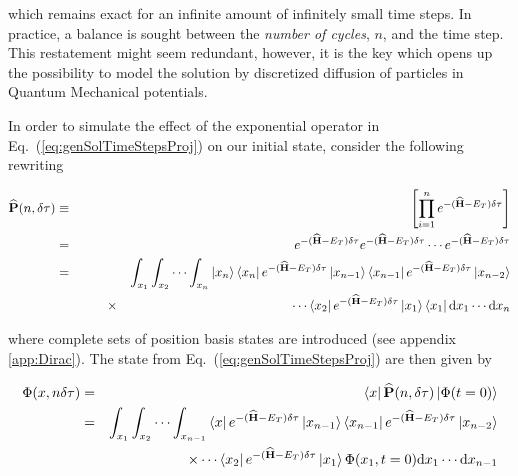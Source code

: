 

which remains exact for an infinite amount of infinitely small time steps. In practice, a balance is sought between the \textit{number of cycles}, $n$, and the time step. This restatement might seem redundant, however, it is the key which opens up the possibility to model the solution by discretized diffusion of particles in Quantum Mechanical potentials. 

In order to simulate the effect of the exponential operator in Eq.~(\ref{eq:genSolTimeStepsProj}) on our initial state,
consider the following rewriting

\begin{eqnarray}
 {\bf\widehat{P}}(n, \delta\tau) &\equiv& \left[\prod_{i=1}^n e^{-({\bf\widehat{H}} - E_T)\delta\tau}\right] \\
  &=& e^{-({\bf\widehat{H}} - E_T)\delta\tau}e^{-({\bf\widehat{H}} - E_T)\delta\tau}\cdots e^{-({\bf\widehat{H}} - E_T)\delta\tau} \\
     &=& \int_{x_1}\int_{x_2}\cdots\int_{x_n} \left| x_n \right>\left< x_n \right| e^{-({\bf\widehat{H}} - E_T)\delta\tau} \left| x_{n-1} \right>\left< x_{n-1} \right|e^{-({\bf\widehat{H}} - E_T)\delta\tau}\left| x_{n-2} \right> \nonumber\\
     &\qquad\qquad\times& \cdots\left< x_2 \right|e^{-({\bf\widehat{H}} - E_T)\delta\tau} \left| x_1 \right>\left< x_1 \right|\mathrm{d}x_{1}\cdots\mathrm{d}x_{n} 
\end{eqnarray}

where complete sets of position basis states are introduced (see appendix \ref{app:Dirac}). The state from Eq.~(\ref{eq:genSolTimeStepsProj}) are then given by

\begin{eqnarray}
 \Phi(x, n\delta\tau) &=& \left< x \right|{\bf\widehat{P}}(n, \delta\tau)\left| \Phi(t=0) \right> \\
                 &=& \int_{x_1}\int_{x_2}\cdots\int_{x_{n-1}}\left< x \right| e^{-({\bf\widehat{H}} - E_T)\delta\tau}
                 \left| x_{n-1} \right>\left< x_{n-1} \right|e^{-({\bf\widehat{H}} - E_T)\delta\tau}\left| x_{n-2} \right> \nonumber\\
                  &&\qquad\quad\,\,\qquad\times \cdots\left< x_2 \right|e^{-({\bf\widehat{H}} - E_T)\delta\tau} \left| x_1 \right>\Phi(x_1, t=0)\mathrm{d}x_{1}\cdots\mathrm{d}x_{n-1} 
\end{eqnarray}

